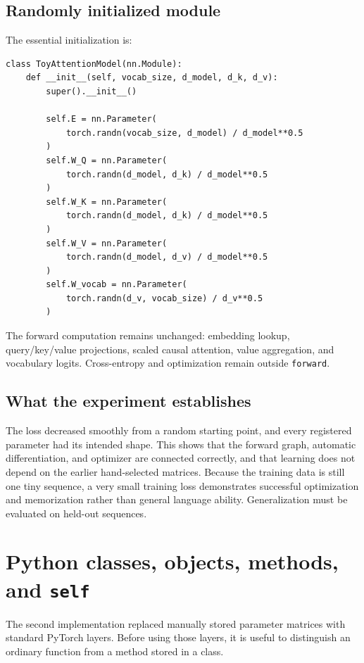 \documentclass[11pt]{article}
\begin{document}
\subsection{Randomly initialized module}

The essential initialization is:
\begin{lstlisting}
class ToyAttentionModel(nn.Module):
    def __init__(self, vocab_size, d_model, d_k, d_v):
        super().__init__()

        self.E = nn.Parameter(
            torch.randn(vocab_size, d_model) / d_model**0.5
        )
        self.W_Q = nn.Parameter(
            torch.randn(d_model, d_k) / d_model**0.5
        )
        self.W_K = nn.Parameter(
            torch.randn(d_model, d_k) / d_model**0.5
        )
        self.W_V = nn.Parameter(
            torch.randn(d_model, d_v) / d_model**0.5
        )
        self.W_vocab = nn.Parameter(
            torch.randn(d_v, vocab_size) / d_v**0.5
        )
\end{lstlisting}
The forward computation remains unchanged: embedding lookup, query/key/value projections, scaled causal
attention, value aggregation, and vocabulary logits. Cross-entropy and optimization remain outside
\texttt{forward}.

\subsection{What the experiment establishes}

The loss decreased smoothly from a random starting point, and every registered parameter had its intended
shape. This shows that the forward graph, automatic differentiation, and optimizer are connected correctly,
and that learning does not depend on the earlier hand-selected matrices. Because the training data is still
one tiny sequence, a very small training loss demonstrates successful optimization and memorization rather
than general language ability. Generalization must be evaluated on held-out sequences.

\section{Python classes, objects, methods, and \texttt{self}}

The second implementation replaced manually stored parameter matrices with standard PyTorch layers. Before
using those layers, it is useful to distinguish an ordinary function from a method stored in a class.
\end{document}

